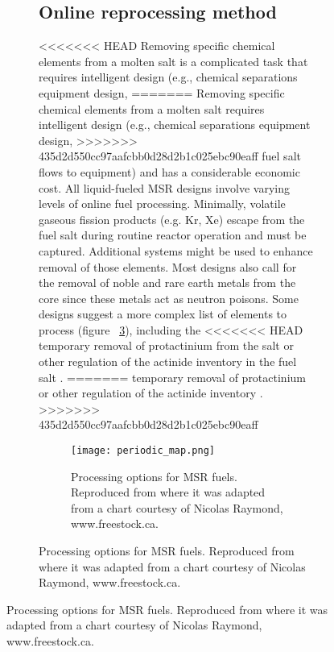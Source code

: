 \begin{figure}[t!]
\begin{figure}[ht!]
\subsection{Online reprocessing method}
<<<<<<< HEAD
Removing specific chemical elements from a molten salt is a complicated task 
that requires intelligent design (e.g., chemical separations equipment design, 
=======
Removing specific chemical elements from a molten salt 
requires intelligent design (e.g., chemical separations equipment design, 
>>>>>>> 435d2d550cc97aafcbb0d28d2b1c025ebc90eaff
fuel salt flows to equipment) and has a considerable economic cost. All 
liquid-fueled \gls{MSR} designs involve varying levels of online fuel 
processing. Minimally, volatile gaseous fission products (e.g. Kr, Xe) escape 
from the fuel salt during routine reactor operation and must be captured. 
Additional systems might be used to enhance removal of those elements. Most 
designs also call for the removal of noble and rare earth metals from the core 
since these metals act as neutron poisons. Some designs suggest a more complex 
list of elements to process (figure ~\ref{fig:periodic_tab}), including the 
<<<<<<< HEAD
temporary removal of protactinium from the salt or other regulation of the 
actinide inventory in the fuel salt \cite{ahmad_neutronics_2015}.
=======
temporary removal of protactinium or other regulation of the 
actinide inventory \cite{ahmad_neutronics_2015}.
>>>>>>> 435d2d550cc97aafcbb0d28d2b1c025ebc90eaff

\begin{figure}[htp!] %
  \texttt{[image: periodic\_map.png]}
  \caption{Processing options for \gls{MSR} fuels. 
          Reproduced from \cite{ahmad_neutronics_2015} where it was adapted 
          from a chart courtesy of Nicolas 
          Raymond, www.freestock.ca.}
  \label{fig:periodic_tab}
\end{figure}


\end{figure}
\end{figure}
